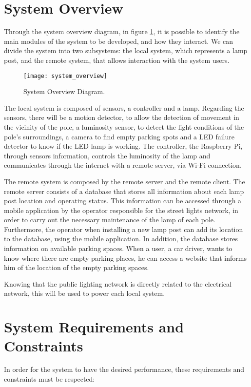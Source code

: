 \section{System Overview}
Through the system overview diagram, in figure \ref{fig:system_overview}, it is possible to identify the main modules of the system to be developed, and how they interact. We can divide the system into two subsystems: the local system, which represents a lamp post, and the remote system, that allows interaction with the system users.

\begin{figure}[ht]
	\centering
	\texttt{[image: system\_overview]}
	\caption{System Overview Diagram.}
	\label{fig:system_overview}
\end{figure}

The local system is composed of sensors, a controller and a lamp. Regarding the sensors, there will be a motion detector, to allow the detection of movement in the vicinity of the pole, a luminosity sensor, to detect the light conditions of the pole’s surroundings, a camera to find empty parking spots and a LED failure detector to know if the LED lamp is working. The controller, the Raspberry Pi, through sensors information, controls the luminosity of the lamp and communicates through the internet with a remote server, via Wi-Fi connection.

The remote system is composed by the remote server and the remote client. The remote server consists of a database that stores all information about each lamp post location and operating status. This information can be accessed through a mobile application by the operator  responsible for the street lights network, in order to carry out the necessary maintenance of the lamp of each pole. Furthermore, the operator when installing a new lamp post can add its location to the database, using the mobile application. In addition, the database stores information on available parking spaces. When a user, a car driver, wants to know where there are empty parking places, he can access a website that informs him of the location of the empty parking spaces.

Knowing that the public lighting network is directly related to the electrical network, this will be used to power each local system.

\section{System Requirements and Constraints}
In order for the system to have the desired performance, these requirements and constraints must be respected:

